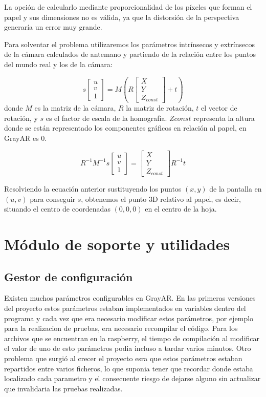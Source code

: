 La opción de calcularlo mediante proporcionalidad de los píxeles que
forman el papel y sus dimensiones no es válida, ya que la distorsión
de la perspectiva generaría un error muy grande.

Para solventar el problema utilizaremos los parámetros intrínsecos y
extrínsecos de la cámara calculados de antemano y partiendo de la
relación entre los puntos del mundo real y los de la cámara:

\begin{equation}
s \begin{bmatrix}
u\\
v\\
1
\end{bmatrix} = M(R\begin{bmatrix}
X\\
Y\\
Z_{const}
\end{bmatrix}+t)
\end{equation}
donde $M$ es la matriz de la cámara, $R$ la matriz de rotación, $t$ el
vector de rotación, y $s$ es el factor de escala de la homografía. $Zconst$ representa la altura
donde se están representado los componentes gráficos en relación al papel, en GrayAR es 0.

\begin{equation}
R^{-1} M^{-1} s \begin{bmatrix}
u\\
v\\
1
\end{bmatrix} = \begin{bmatrix}
X\\
Y\\
Z_{const}
\end{bmatrix} R^{-1}t
\end{equation}

Resolviendo la ecuación anterior sustituyendo los puntos $(x,y)$ de la
pantalla en $(u,v)$ para conseguir $s$, obtenemos el punto 3D relativo
al papel, es decir, situando el centro de coordenadas $(0,0,0)$ en el
centro de la hoja.



\section{Módulo de soporte y utilidades}
\subsection{Gestor de configuración}
Existen muchos parámetros configurables en GrayAR. En las primeras versiones del proyecto estos parámetros estaban implementados en variables dentro del programa y cada vez que era necesario modificar estos parámetros, por ejemplo para la realizacion de pruebas, era necesario recompilar el código. Para los archivos que se encuentran en la raspberry, el tiempo de compilación al modificar el valor de uno de esto parámetros podia incluso a tardar varios minutos. Otro problema que surgió al crecer el proyecto esra que estos parámetros estaban repartidos entre varios ficheros, lo que suponia tener que recordar donde estaba localizado cada parametro y el consecuente riesgo de dejarse alguno sin actualizar que invalidaria las pruebas realizadas.

